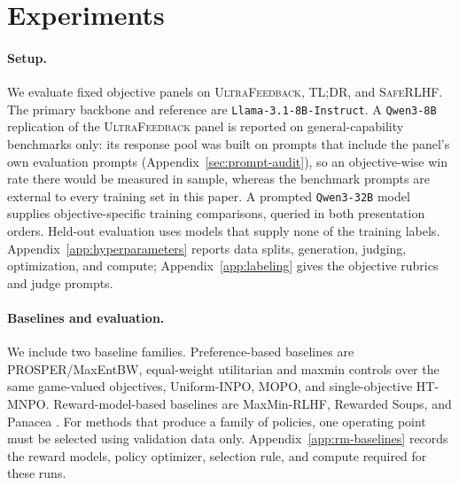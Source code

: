 \documentclass{article}
\theoremstyle{remark}
\theoremstyle{plain}
\begin{document}
\section{Experiments}
\label{sec:experiments}
\paragraph{Setup.}
We evaluate fixed objective panels on \textsc{UltraFeedback}, \textsc{TL;DR}, and \textsc{SafeRLHF}. The primary backbone and reference are \texttt{Llama-3.1-8B-Instruct}. A \texttt{Qwen3-8B} replication of the \textsc{UltraFeedback} panel is reported on general-capability benchmarks only: its response pool was built on prompts that include the panel's own evaluation prompts (Appendix~\ref{sec:prompt-audit}), so an objective-wise win rate there would be measured in sample, whereas the benchmark prompts are external to every training set in this paper. A prompted \texttt{Qwen3-32B} model supplies objective-specific training comparisons, queried in both presentation orders. Held-out evaluation uses models that supply none of the training labels. Appendix~\ref{app:hyperparameters} reports data splits, generation, judging, optimization, and compute; Appendix~\ref{app:labeling} gives the objective rubrics and judge prompts.

\paragraph{Baselines and evaluation.}
We include two baseline families. Preference-based baselines are PROSPER/MaxEntBW, equal-weight utilitarian and maxmin controls over the same game-valued objectives, Uniform-INPO, MOPO, and single-objective HT-MNPO. Reward-model-based baselines are MaxMin-RLHF, Rewarded Soups, and Panacea \citep{chakraborty2024maxmin,rame2023rewarded,zhong2024panacea}. For methods that produce a family of policies, one operating point must be selected using validation data only. Appendix~\ref{app:rm-baselines} records the reward models, policy optimizer, selection rule, and compute required for these runs.
\end{document}
